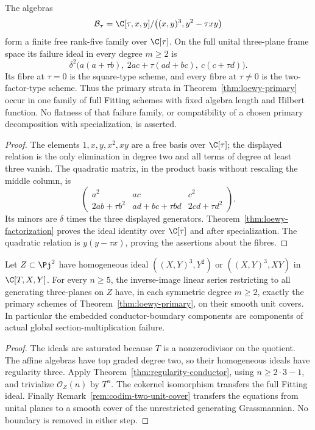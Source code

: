 \begin{proposition}
\label{prop:loewy-collision}
The algebras
\[
 \mathcal B_\tau=\C[\tau,x,y]/\bigl((x,y)^3,y^2-\tau xy\bigr)
\]
form a finite free rank-five family over $\C[\tau]$. On the full
unital three-plane frame space its failure ideal in every degree
$m\ge2$ is
\begin{equation}\label{eq:loewy-collision}
 \delta^2\bigl(a(a+\tau b),\
       2ac+\tau(ad+bc),\ c(c+\tau d)\bigr).
\end{equation}
Its fibre at $\tau=0$ is the square-type scheme, and every fibre
at $\tau\ne0$ is the two-factor-type scheme. Thus the primary
strata in Theorem~\ref{thm:loewy-primary} occur in one family of
full Fitting schemes with fixed algebra length and Hilbert function.
No flatness of that failure family, or compatibility of a chosen
primary decomposition with specialization, is asserted.
\end{proposition}
\begin{proof}
The elements $1,x,y,x^2,xy$ are a free basis over $\C[\tau]$;
the displayed relation is the only elimination in degree two and
all terms of degree at least three vanish. The quadratic matrix,
in the product basis without rescaling the middle column, is
\[
 \begin{pmatrix}
 a^2&ac&c^2\\
 2ab+\tau b^2&ad+bc+\tau bd&2cd+\tau d^2
 \end{pmatrix}.
\]
Its minors are $\delta$ times the three displayed generators.
Theorem~\ref{thm:loewy-factorization} proves the ideal identity over
$\C[\tau]$ and after specialization. The quadratic relation is
$y(y-\tau x)$, proving the assertions about the fibres.
\end{proof}

\begin{corollary}[Projective realization of the complete boundary]
\label{cor:loewy-global}
Let $Z\subset\Pj^2$ have homogeneous ideal
$((X,Y)^3,Y^2)$ or $((X,Y)^3,XY)$ in $\C[T,X,Y]$.
For every $n\ge5$, the inverse-image linear series restricting to
all generating three-planes on $Z$ have, in each symmetric degree
$m\ge2$, exactly the primary schemes of
Theorem~\ref{thm:loewy-primary}, on their smooth unit covers.
In particular the embedded conductor-boundary components are
components of actual global section-multiplication failure.
\end{corollary}
\begin{proof}
The ideals are saturated because $T$ is a nonzerodivisor on the
quotient. The affine algebras have top graded degree two, so their
homogeneous ideals have regularity three. Apply
Theorem~\ref{thm:regularity-conductor}, using $n\ge2\cdot3-1$,
and trivialize $\mathcal O_Z(n)$ by $T^n$.
The cokernel isomorphism transfers the full Fitting ideal. Finally
Remark~\ref{rem:codim-two-unit-cover} transfers the equations from
unital planes to a smooth cover of the unrestricted generating
Grassmannian. No boundary is removed in either step.
\end{proof}
